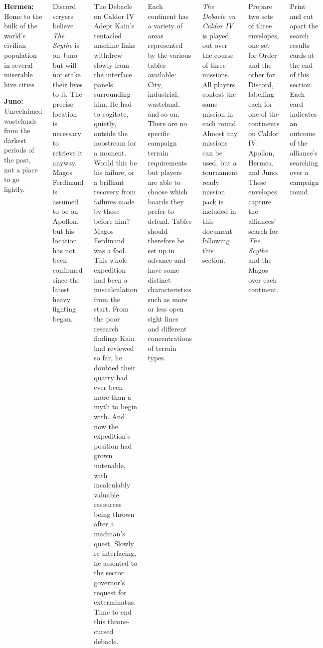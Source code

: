 \begin{columns}
\begin{squishitemize}
  \item \textbf{Hermea:} Home to the bulk of the world's civilian
    population in several miserable hive cities.

  \item \textbf{Juno:} Unreclaimed wastelands from the darkest periods
    of the past, not a place to go lightly.
  \end{squishitemize}

  Discord scryers believe \emph{The Scythe} is on Juno but will not
  stake their lives to it.  The precise location is necessary to
  retrieve it anyway.  Magos Ferdinand is assumed to be on Apollon,
  but his location has not been confirmed since the latest heavy
  fighting began.

\columnbreak
\begin{sidestory}{1.7in}{The Debacle on Caldor IV}
  Adept Kain's tentacled machine links withdrew slowly from the
  interface panels surrounding him. He had to cogitate, quietly,
  outside the noostream for a moment. Would this be his failure, or a
  brilliant recovery from failures made by those before him? Magos
  Ferdinand was a fool. This whole expedition had been a
  miscalculation from the start. From the poor research findings Kain
  had reviewed so far, he doubted their quarry had ever been more than
  a myth to begin with. And now the expedition's position had grown
  untenable, with incalculably valuable resources being thrown after a
  madman's quest. Slowly re-interfacing, he assented to the sector
  governor's request for exterminatus. Time to end this throne-cursed
  debacle.
\end{sidestory}


Each continent has a variety of areas represented by the various
tables available: City, industrial, wasteland, and so on.  There are
no specific campaign terrain requirements but players are able to
choose which boards they prefer to defend.  Tables should therefore be
set up in advance and have some distinct characteristics such as more
or less open sight lines and different concentrations of terrain
types.



\emph{The Debacle on Caldor IV} is played out over the course of three
missions.  All players contest the same mission in each round.  Almost
any missions can be used, but a tournament ready mission pack is
included in this document following this section.


Prepare two sets of three envelopes, one set for Order and the other
for Discord, labelling each for one of the continents on Caldor IV:
Apollon, Hermea, and Juno.  These envelopes capture the alliances'
search for \emph{The Scythe} and the Magos over each continent.

{Print and cut apart the search results cards at the end of this
  section.  Each card indicates an outcome of the alliance's searching
  over a campaign round.}\unskip\parfillskip 0pt \par

\end{columns}

